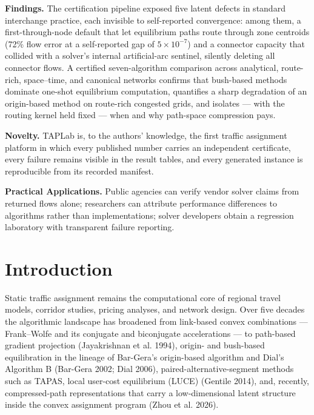 \documentclass[11pt]{article}
\newcommand{\citepara}[1]{(#1)}
\begin{document}
\textbf{Findings.} The certification pipeline exposed five latent defects in
standard interchange practice, each invisible to self-reported convergence:
among them, a first-through-node default that let equilibrium paths route
through zone centroids (72\% flow error at a self-reported gap of
$5\times10^{-7}$) and a connector capacity that collided with a solver's
internal artificial-arc sentinel, silently deleting all connector flows.
A certified seven-algorithm comparison across analytical, route-rich,
space--time, and canonical networks confirms that bush-based methods
dominate one-shot equilibrium computation, quantifies a sharp degradation
of an origin-based method on route-rich congested grids, and isolates ---
with the routing kernel held fixed --- when and why path-space compression
pays.

\textbf{Novelty.} TAPLab is, to the authors' knowledge, the first traffic
assignment platform in which every published number carries an independent
certificate, every failure remains visible in the result tables, and every
generated instance is reproducible from its recorded manifest.

\textbf{Practical Applications.} Public agencies can verify vendor solver
claims from returned flows alone; researchers can attribute performance
differences to algorithms rather than implementations; solver developers
obtain a regression laboratory with transparent failure reporting.

\newpage
\linenumbers
\section{Introduction}

Static traffic assignment remains the computational core of regional travel
models, corridor studies, pricing analyses, and network design. Over five
decades the algorithmic landscape has broadened from link-based convex
combinations --- Frank--Wolfe and its conjugate and biconjugate
accelerations --- to path-based gradient projection
\citepara{Jayakrishnan et al. 1994}, origin- and bush-based equilibration in
the lineage of Bar-Gera's origin-based algorithm and Dial's Algorithm B
\citepara{Bar-Gera 2002; Dial 2006}, paired-alternative-segment methods
such as TAPAS, local user-cost equilibrium (LUCE) \citepara{Gentile 2014},
and, recently, compressed-path representations that carry a low-dimensional
latent structure inside the convex assignment program
\citepara{Zhou et al. 2026}.
\end{document}
